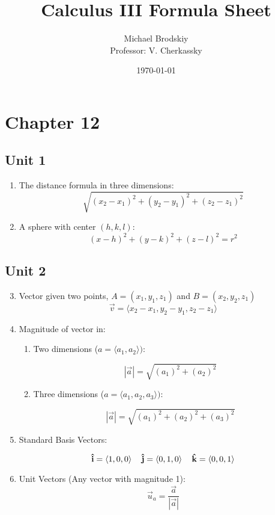 \documentclass[12pt]{article}
\title{Calculus III Formula Sheet}
\date{\today}
\author{Michael Brodskiy\\ \small Professor: V. Cherkassky}
\begin{document}
\maketitle

\section{Chapter 12}

\subsection{Unit 1}

\begin{enumerate}

  \item The distance formula in three dimensions:
    $$\sqrt{(x_2-x_1)^2+(y_2-y_1)^2+(z_2-z_1)^2}$$

  \item A sphere with center $(h,k,l)$:
    $$(x-h)^2+(y-k)^2+(z-l)^2=r^2$$

\end{enumerate}

\subsection{Unit 2}

\begin{enumerate}
\setcounter{enumi}{2}

  \item Vector given two points, $A=(x_1,y_1,z_1)$ and $B=(x_2,y_2,z_1)$
    $$\overrightarrow{v}=\langle x_2-x_1, y_2-y_1, z_2-z_1\rangle$$

  \item Magnitude of vector in:
    \begin{enumerate}

      \item Two dimensions ($a=\langle a_1,a_2\rangle)$:

        $$|\overrightarrow{a}|=\sqrt{(a_1)^2+(a_2)^2}$$

      \item Three dimensions ($a=\langle a_1,a_2,a_3\rangle)$:

        $$|\overrightarrow{a}|=\sqrt{(a_1)^2+(a_2)^2+(a_3)^2}$$

    \end{enumerate}

  \item Standard Basis Vectors:

    $$\bold{\hat{i}}=\langle 1,0,0\rangle\,\,\,\,\,\,\,\bold{\hat{j}}=\langle0,1,0\rangle\,\,\,\,\,\,\,\bold{\hat{k}}=\langle 0,0,1\rangle$$

  \item Unit Vectors (Any vector with magnitude 1):
    $$\overrightarrow{u}_a=\frac{\overrightarrow{a}}{|\overrightarrow{a}|}$$

\end{enumerate}
\end{document}
